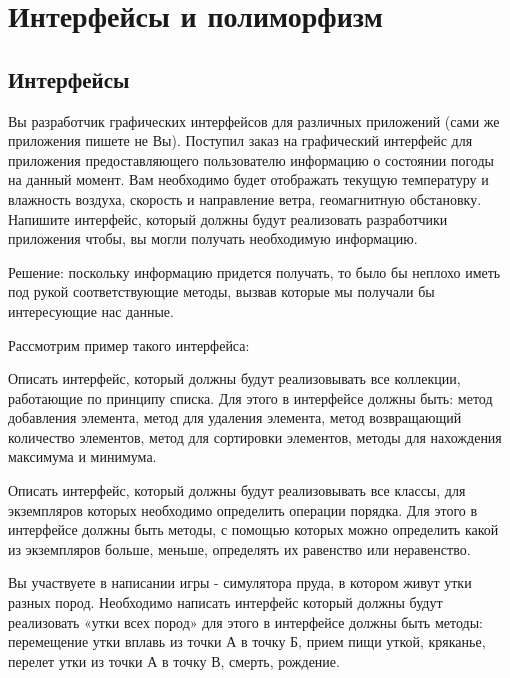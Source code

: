 \section{Интерфейсы и полиморфизм}

\subsection{Интерфейсы}

Вы разработчик графических интерфейсов для различных приложений (сами
же приложения пишете не Вы). Поступил заказ на графический интерфейс
для приложения предоставляющего пользователю информацию о состоянии
погоды на данный момент. Вам необходимо будет отображать текущую
температуру и влажность воздуха, скорость и направление ветра,
геомагнитную обстановку. Напишите интерфейс, который должны будут
реализовать разработчики приложения чтобы, вы могли получать
необходимую информацию.

Решение: поскольку информацию придется получать, то было бы неплохо
иметь под рукой соответствующие методы, вызвав которые мы получали бы
интересующие нас данные.

Рассмотрим пример такого интерфейса:



\task Описать интерфейс, который должны будут реализовывать все
коллекции, работающие по принципу списка. Для этого в интерфейсе
должны быть: метод добавления элемента, метод для удаления элемента,
метод возвращающий количество элементов, метод для сортировки
элементов, методы для нахождения максимума и минимума.

\task Описать интерфейс, который должны будут реализовывать все
классы, для экземпляров которых необходимо определить операции
порядка. Для этого в интерфейсе должны быть методы, с помощью которых
можно определить какой из экземпляров больше, меньше, определять их
равенство или неравенство.

\task Вы участвуете в написании игры - симулятора пруда, в котором
живут утки разных пород. Необходимо написать интерфейс который должны
будут реализовать «утки всех пород» для этого в интерфейсе должны быть
методы: перемещение утки вплавь из точки А в точку Б, прием пищи
уткой, кряканье, перелет утки из точки А в точку В, смерть, рождение.

